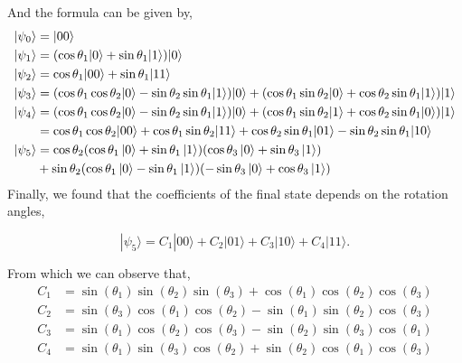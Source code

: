 \documentclass[11p]{article}
\begin{document}
And the formula can be given by,
\begin{align*}
|\psi_0\rangle &= |00 \rangle \\
|\psi_1\rangle &= (\cos\theta_1|0\rangle + \sin\theta_1|1\rangle)|0\rangle\\
|\psi_2\rangle & = \cos\theta_1|00\rangle + \sin\theta_1|11\rangle\\
|\psi_3\rangle &=(\cos\theta_1\cos\theta_2|0\rangle - \sin\theta_2\sin\theta_1|1\rangle)|0\rangle + (\cos\theta_1\sin\theta_2|0\rangle + \cos\theta_2\sin\theta_1|1\rangle)|1\rangle\\
|\psi_4\rangle &=(\cos\theta_1\cos\theta_2|0\rangle - \sin\theta_2\sin\theta_1|1\rangle)|0\rangle + (\cos\theta_1\sin\theta_2|1\rangle + \cos\theta_2\sin\theta_1|0\rangle)|1\rangle\\
&=\cos\theta_1\cos\theta_2|00\rangle + \cos\theta_1\sin\theta_2|11\rangle + \cos\theta_2\sin\theta_1|01\rangle- \sin\theta_2\sin\theta_1|10\rangle\\
|\psi_5\rangle&=\cos\theta_2(\cos\theta_1\ket{0}+\sin\theta_1\ket{1})(\cos\theta_3\ket{0}+\sin\theta_3\ket{1})\\
&+\sin\theta_2(\cos\theta_1\ket{0}-\sin\theta_1\ket{1})(-\sin\theta_3\ket{0}+\cos\theta_3\ket{1})\\
\end{align*}
Finally, we found that the coefficients of the final state depends on the rotation angles,

\[
    |\psi_5\rangle= C_1|00\rangle + C_2|01\rangle + C_3|10\rangle +C_4 |11\rangle.
\]

From which we can observe that,
\[
    \begin{aligned}
    C_1 &=     \sin(\theta_1)  \sin(\theta_2)  \sin(\theta_3) +  \cos(\theta_1)  \cos(\theta_2)  \cos(\theta_3)\\
    C_2 &=    \sin(\theta_3)  \cos(\theta_1)  \cos(\theta_2) -  \sin(\theta_1)  \sin(\theta_2)  \cos(\theta_3)\\
    C_3 &=   \sin(\theta_1)  \cos(\theta_2)  \cos(\theta_3) -   \sin(\theta_2)  \sin(\theta_3)  \cos(\theta_1)\\
    C_4 &=   \sin(\theta_1)  \sin(\theta_3)  \cos(\theta_2) +   \sin(\theta_2)  \cos(\theta_1)  \cos(\theta_3)
    \end{aligned}
\]
\end{document}
